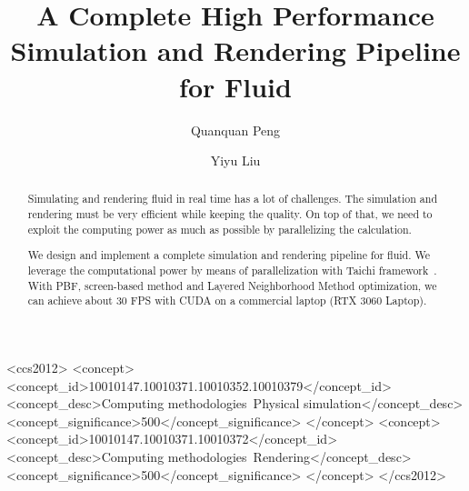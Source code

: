 \documentclass[sigconf]{acmart}
\begin{document}
\title{A Complete High Performance Simulation and Rendering Pipeline for Fluid}

\author{Quanquan Peng}
\author{Yiyu Liu}
\authornotemark[1]

\renewcommand{\shortauthors}{Trovato et al.}

\begin{abstract}
  Simulating and rendering fluid in real time has a lot of challenges. The simulation and rendering must be very efficient while keeping the quality. On top of that, we need to exploit the computing power as much as possible by parallelizing the calculation.

  We design and implement a complete simulation and rendering pipeline for fluid. We leverage the computational power by means of parallelization with Taichi framework~\cite{hu2019taichi, hu2019difftaichi, hu2021quantaichi}. With PBF, screen-based method and Layered Neighborhood Method optimization, we can achieve about 30 FPS with CUDA on a commercial laptop (RTX 3060 Laptop).
\end{abstract}

\begin{CCSXML}
<ccs2012>
<concept>
<concept_id>10010147.10010371.10010352.10010379</concept_id>
<concept_desc>Computing methodologies~Physical simulation</concept_desc>
<concept_significance>500</concept_significance>
</concept>
<concept>
<concept_id>10010147.10010371.10010372</concept_id>
<concept_desc>Computing methodologies~Rendering</concept_desc>
<concept_significance>500</concept_significance>
</concept>
</ccs2012>
\end{CCSXML}
\end{document}
